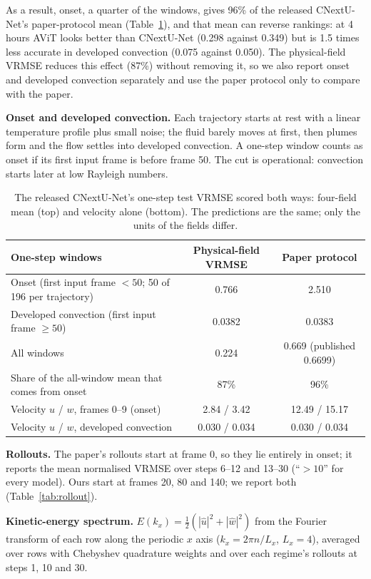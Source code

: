 \documentclass[11pt]{article}
\begin{document}
As a result, onset, a quarter of the windows, gives 96\% of the released CNextU-Net's paper-protocol mean
(Table~\ref{tab:units}), and that mean can reverse rankings: at 4 hours AViT looks better than CNextU-Net (0.298
against 0.349) but is 1.5 times less accurate in developed convection (0.075 against 0.050). The physical-field
VRMSE reduces this effect (87\%) without removing it, so we also report onset and
developed convection separately and use the paper protocol only to compare with the paper.

\textbf{Onset and developed convection.} Each trajectory starts at rest with a linear temperature profile plus small
noise; the fluid barely moves at first, then plumes form and the flow settles into developed convection. A one-step
window counts as onset if its first input frame is before frame 50. The cut is operational: convection starts later at low Rayleigh numbers.

\begin{table}[!htbp]
\centering\small
\begin{tabular}{@{}lcc@{}}
\toprule
One-step windows & Physical-field VRMSE & Paper protocol \\
\midrule
Onset (first input frame $<50$; 50 of 196 per trajectory) & 0.766 & 2.510 \\
Developed convection (first input frame $\geq 50$) & 0.0382 & 0.0383 \\
All windows & 0.224 & 0.669 (published 0.6699) \\
\midrule
Share of the all-window mean that comes from onset & 87\% & 96\% \\
\midrule
Velocity $u$ / $w$, frames 0--9 (onset) & 2.84 / 3.42 & 12.49 / 15.17 \\
Velocity $u$ / $w$, developed convection & 0.030 / 0.034 & 0.030 / 0.034 \\
\bottomrule
\end{tabular}
\caption{The released CNextU-Net's one-step test VRMSE scored both ways: four-field mean (top) and velocity alone
(bottom). The predictions are the same; only the units of the fields differ.}
\label{tab:units}
\end{table}

\textbf{Rollouts.} The paper's rollouts start at frame 0, so they lie entirely in onset; it reports the mean
normalised VRMSE over steps 6--12 and 13--30 (``$>10$'' for every model). Ours start at frames 20, 80 and 140; we
report both (Table~\ref{tab:rollout}).

\textbf{Kinetic-energy spectrum.} $E(k_x)=\tfrac12(|\hat u|^2+|\hat w|^2)$ from the Fourier transform of each row
along the periodic $x$ axis ($k_x=2\pi n/L_x$, $L_x=4$), averaged over rows with Chebyshev quadrature weights and
over each regime's rollouts at steps 1, 10 and 30.
\end{document}
